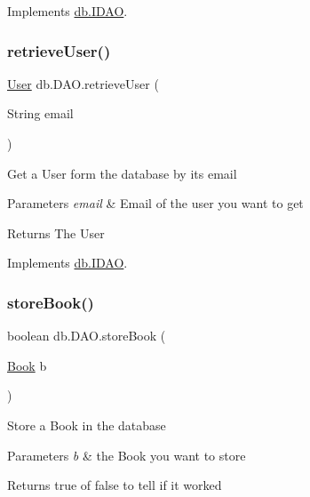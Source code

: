 Implements \hyperlink{interfacedb_1_1_i_d_a_o_a53fd20610d94f7c5f0f713dad7528c26}{db.\+I\+D\+AO}.

\mbox{\label{classdb_1_1_d_a_o_a6da084ffd9b0da23acba9dc68e747303}} 
\subsubsection{\texorpdfstring{retrieve\+User()}{retrieveUser()}}
{\footnotesize\ttfamily \hyperlink{classserver_1_1data_1_1_user}{User} db.\+D\+A\+O.\+retrieve\+User (\begin{DoxyParamCaption}\item[{String}]{email }\end{DoxyParamCaption})}

Get a User form the database by its email 
\begin{DoxyParams}{Parameters}
{\em email} & Email of the user you want to get \\
\hline
\end{DoxyParams}
\begin{DoxyReturn}{Returns}
The User 
\end{DoxyReturn}


Implements \hyperlink{interfacedb_1_1_i_d_a_o_ad00bb5255d0badadbf5244799c3b708f}{db.\+I\+D\+AO}.

\mbox{\label{classdb_1_1_d_a_o_a036246b8124d7ac8a36e3eaafd3eb81a}} 
\subsubsection{\texorpdfstring{store\+Book()}{storeBook()}}
{\footnotesize\ttfamily boolean db.\+D\+A\+O.\+store\+Book (\begin{DoxyParamCaption}\item[{\hyperlink{classserver_1_1data_1_1_book}{Book}}]{b }\end{DoxyParamCaption})}

Store a Book in the database 
\begin{DoxyParams}{Parameters}
{\em b} & the Book you want to store \\
\hline
\end{DoxyParams}
\begin{DoxyReturn}{Returns}
true of false to tell if it worked 
\end{DoxyReturn}


